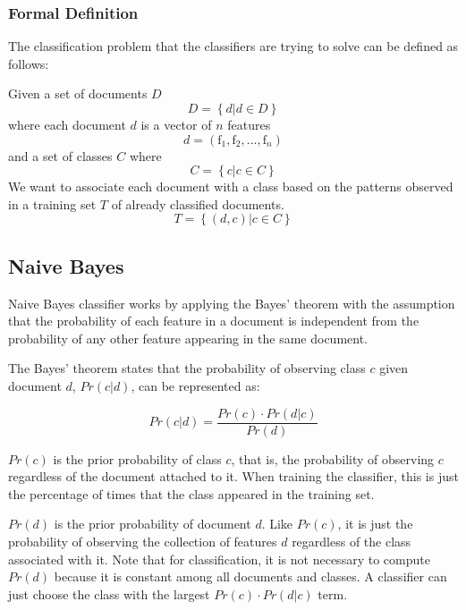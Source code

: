 \documentclass[12pt]{ucthesis}
\begin{document}
\subsubsection{Formal Definition}
\label{background-classifiers-def}
The classification problem that the classifiers are trying to solve can be defined as follows:

Given a set of documents $D$
\begin{equation*}
   D = \left \{ d | d \in D \right \}
\end{equation*}
where each document $d$ is a vector of $n$ features
\begin{equation*}
   d = (\textrm{f}_{1}, \textrm{f}_{2}, ..., \textrm{f}_{n})
\end{equation*}
and a set of classes $C$ where
\begin{equation*}
   C = \left \{ c | c \in C \right \}
\end{equation*}
We want to associate each document with a class based on the patterns observed in a training set $T$ of already classified documents.
\begin{equation*}
   T = \left \{ (d, c) | c \in C \right \}
\end{equation*}

\subsection{Naive Bayes}
\label{background-classifiers-naive-bayes}
Naive Bayes classifier works by applying the Bayes' theorem with the assumption that
the probability of each feature in a document is independent from the probability of
any other feature appearing in the same document.\cite{Kibriya}\cite{Frank}

The Bayes' theorem states that the probability of observing class $c$ given document $d$, $Pr(c|d)$, can be represented as:

\begin{equation}
   Pr(c|d) = \frac{Pr(c) \cdot Pr(d|c)}{Pr(d)}
\end{equation}

$Pr(c)$ is the \textsf{prior probability} of class $c$, that is, the probability of
observing $c$ regardless of the document attached to it. When training the classifier, this
is just the percentage of times that the class appeared in the training set.

$Pr(d)$ is the \textsf{prior probability} of document $d$. Like $Pr(c)$, it is just the
probability of observing the collection of features $d$ regardless of the class associated with it.
Note that for classification, it is not necessary to compute $Pr(d)$ because it is constant among all
documents and classes. A classifier can just choose the class with the largest $Pr(c) \cdot Pr(d|c)$ term.
\end{document}
